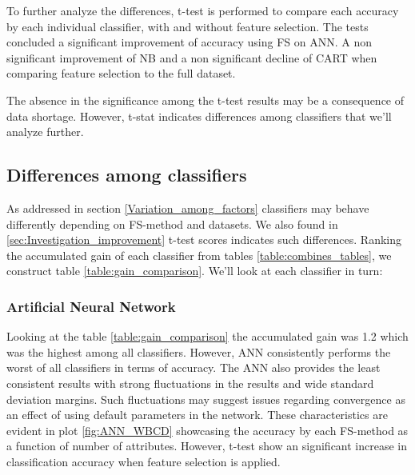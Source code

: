 To further analyze the differences, t-test is performed to compare each accuracy by each individual classifier, with and without feature selection. The tests concluded a significant improvement of accuracy using FS on ANN. A non significant improvement of NB and a non significant decline of CART when comparing feature selection to the full dataset.



The absence in the significance among the t-test results may be a consequence of data shortage. However, t-stat indicates differences among classifiers that we'll analyze further.


\subsection{Differences among classifiers}

As addressed in section \ref{Variation_among_factors} classifiers may behave differently depending on FS-method and datasets. We also found in \ref{sec:Investigation_improvement} t-test scores indicates such differences. Ranking the accumulated gain of each classifier from tables \ref{table:combines_tables}, we construct table \ref{table:gain_comparison}. We'll look at each classifier in turn:

\begin{table}[hp]
  
  \caption[]%
  {{\small Ranking of which classifiers gained most accuracy when comparing feature selection to full dataset.}}
  \label{table:gain_comparison}
\end{table}

\subsubsection{Artificial Neural Network}

Looking at the table \ref{table:gain_comparison} the accumulated gain was 1.2 which was the highest among all classifiers. However, ANN consistently performs the worst of all classifiers in terms of accuracy. The ANN also provides the least consistent results with strong fluctuations in the results and wide standard deviation margins. Such fluctuations may suggest issues regarding convergence as an effect of using default parameters in the network. These characteristics are evident in plot \ref{fig:ANN_WBCD} showcasing the accuracy by each FS-method as a function of number of attributes. However, t-test show an significant increase in classification accuracy when feature selection is applied.

